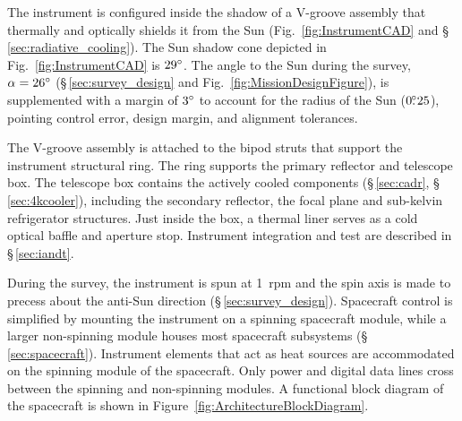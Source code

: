 The instrument is configured inside the shadow of a V-groove assembly that thermally and optically shields it from the Sun (Fig.~\ref{fig:InstrumentCAD} and \S\,\ref{sec:radiative_cooling}). 
The Sun shadow cone depicted in Fig.~\ref{fig:InstrumentCAD} is $29^\circ$. The angle to the Sun during the survey, $\alpha = 26^\circ$ (\S\,\ref{sec:survey_design} and Fig.~\ref{fig:MissionDesignFigure}), is supplemented with a margin of $3^\circ$ to account for the radius of the Sun ($0.\!\!^\circ25$), pointing control error, design margin, and alignment tolerances.

The V-groove assembly is attached to the bipod struts that support the instrument structural ring. The ring supports the primary reflector and telescope box. The telescope box contains the actively cooled components (\S\,\ref{sec:cadr}, \S\,\ref{sec:4kcooler}), including the secondary reflector, the focal plane and sub-kelvin refrigerator structures. Just inside the box, a thermal liner serves as a cold optical baffle and aperture stop. Instrument integration and test are described in \S\,\ref{sec:iandt}.

During the survey, the instrument is spun at 1~rpm and the spin axis is made to precess about the anti-Sun direction (\S\,\ref{sec:survey_design}). Spacecraft control is simplified by mounting the instrument on a spinning spacecraft module, while a larger non-spinning module houses most spacecraft subsystems (\S\,\ref{sec:spacecraft}). Instrument elements that act as heat sources are accommodated on the spinning module of the spacecraft. Only power and digital data lines cross between the spinning and non-spinning modules.  A functional block diagram of the spacecraft is shown in Figure~\ref{fig:ArchitectureBlockDiagram}. 

